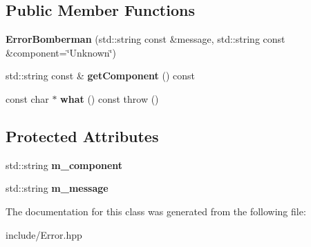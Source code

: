 \subsection*{Public Member Functions}
\begin{DoxyCompactItemize}
\item 
\hypertarget{class_error_bomberman_a46787045c3a6f8659423dc3d2d237402}{}{\bfseries Error\+Bomberman} (std\+::string const \&message, std\+::string const \&component=\char`\"{}Unknown\char`\"{})\label{class_error_bomberman_a46787045c3a6f8659423dc3d2d237402}

\item 
\hypertarget{class_error_bomberman_acf935b846609b3e0bdfe6168e37ab5bf}{}std\+::string const \& {\bfseries get\+Component} () const \label{class_error_bomberman_acf935b846609b3e0bdfe6168e37ab5bf}

\item 
\hypertarget{class_error_bomberman_a137f8797592639c408c154ea76dd4415}{}const char $\ast$ {\bfseries what} () const   throw ()\label{class_error_bomberman_a137f8797592639c408c154ea76dd4415}

\end{DoxyCompactItemize}
\subsection*{Protected Attributes}
\begin{DoxyCompactItemize}
\item 
\hypertarget{class_error_bomberman_a4586b106eaa60ea9c08bf5bcb986748b}{}std\+::string {\bfseries m\+\_\+component}\label{class_error_bomberman_a4586b106eaa60ea9c08bf5bcb986748b}

\item 
\hypertarget{class_error_bomberman_a6148cfdc6c52af86689a50d69831d4c8}{}std\+::string {\bfseries m\+\_\+message}\label{class_error_bomberman_a6148cfdc6c52af86689a50d69831d4c8}

\end{DoxyCompactItemize}


The documentation for this class was generated from the following file\+:\begin{DoxyCompactItemize}
\item 
include/Error.\+hpp\end{DoxyCompactItemize}
